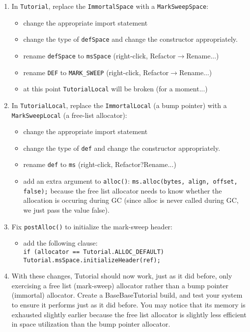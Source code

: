 \documentclass[textsize=14pt]{article}
\newcommand{\code}[1]{\texttt{#1}}
\newcommand{\menu}[0]{$\rightarrow$}
\begin{document}
\begin{itemize}
\begin{enumerate}
\begin{enumerate}
        \item In \code{Tutorial}, replace the \code{ImmortalSpace} with a
        \code{MarkSweepSpace}:
        \begin{itemize}
            \item change the appropriate import statement
            \item change the type of \code{defSpace} and change the constructor
            appropriately.
            \item rename \code{defSpace} to \code{msSpace} (right-click, Refactor\menu{}Rename...)
            \item rename \code{DEF} to \code{MARK\_SWEEP} (right-click, Refactor\menu{}Rename...)
            \item at this point \code{TutorialLocal} will be broken (for a moment...)
        \end{itemize}

        \item In \code{TutorialLocal}, replace the \code{ImmortalLocal} (a bump
        pointer) with a \code{MarkSweepLocal} (a free-list allocator):
        \begin{itemize}
            \item change the appropriate import statement
            \item change the type of \code{def} and change the constructor appropriately.
            \item rename \code{def} to \code{ms} (right-click, Refactor?Rename...)
            \item add an extra argument to \code{alloc()}: \code{ms.alloc(bytes, align, offset,
            false);} because the free list allocator needs to know whether the allocation
            is occuring during GC (since alloc is never called during GC, we just pass the
            value false).
        \end{itemize}

        \item Fix \code{postAlloc()} to initialize the mark-sweep header:
        \begin{itemize}
            \item add the following clause: \\
            \code{if (allocator == Tutorial.ALLOC\_DEFAULT) \\
            Tutorial.msSpace.initializeHeader(ref);}
        \end{itemize}


        \item With these changes, Tutorial should now work, just as it did before,
        only exercising a free list (mark-sweep) allocator rather than a bump pointer
        (immortal) allocator. Create a BaseBaseTutorial build, and test your system to
        ensure it performs just as it did before.  You may notice that its
        memory is exhausted slightly earlier because the free list allocator
        is slightly less efficient in space utilization than the bump
        pointer allocator.
    \end{enumerate}




\end{enumerate}
\end{itemize}
\end{document}
